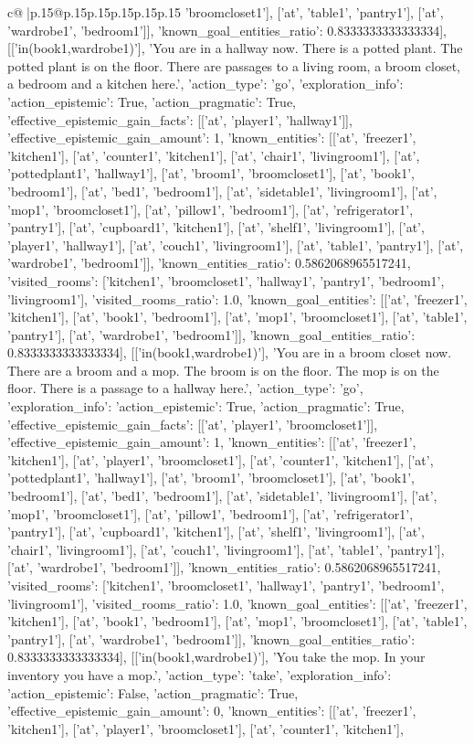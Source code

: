 \documentclass{article}
\begin{document}
{\begin{supertabular}{c@{$\;$}|p{.15\linewidth}@{}p{.15\linewidth}p{.15\linewidth}p{.15\linewidth}p{.15\linewidth}p{.15\linewidth}}
{{{'broomcloset1'], ['at', 'table1', 'pantry1'], ['at', 'wardrobe1', 'bedroom1']], 'known_goal_entities_ratio': 0.8333333333333334}}], [['in(book1,wardrobe1)'], 'You are in a hallway now. There is a potted plant. The potted plant is on the floor. There are passages to a living room, a broom closet, a bedroom and a kitchen here.', {'action_type': 'go', 'exploration_info': {'action_epistemic': True, 'action_pragmatic': True, 'effective_epistemic_gain_facts': [['at', 'player1', 'hallway1']], 'effective_epistemic_gain_amount': 1, 'known_entities': [['at', 'freezer1', 'kitchen1'], ['at', 'counter1', 'kitchen1'], ['at', 'chair1', 'livingroom1'], ['at', 'pottedplant1', 'hallway1'], ['at', 'broom1', 'broomcloset1'], ['at', 'book1', 'bedroom1'], ['at', 'bed1', 'bedroom1'], ['at', 'sidetable1', 'livingroom1'], ['at', 'mop1', 'broomcloset1'], ['at', 'pillow1', 'bedroom1'], ['at', 'refrigerator1', 'pantry1'], ['at', 'cupboard1', 'kitchen1'], ['at', 'shelf1', 'livingroom1'], ['at', 'player1', 'hallway1'], ['at', 'couch1', 'livingroom1'], ['at', 'table1', 'pantry1'], ['at', 'wardrobe1', 'bedroom1']], 'known_entities_ratio': 0.5862068965517241, 'visited_rooms': ['kitchen1', 'broomcloset1', 'hallway1', 'pantry1', 'bedroom1', 'livingroom1'], 'visited_rooms_ratio': 1.0, 'known_goal_entities': [['at', 'freezer1', 'kitchen1'], ['at', 'book1', 'bedroom1'], ['at', 'mop1', 'broomcloset1'], ['at', 'table1', 'pantry1'], ['at', 'wardrobe1', 'bedroom1']], 'known_goal_entities_ratio': 0.8333333333333334}}], [['in(book1,wardrobe1)'], 'You are in a broom closet now. There are a broom and a mop. The broom is on the floor. The mop is on the floor. There is a passage to a hallway here.', {'action_type': 'go', 'exploration_info': {'action_epistemic': True, 'action_pragmatic': True, 'effective_epistemic_gain_facts': [['at', 'player1', 'broomcloset1']], 'effective_epistemic_gain_amount': 1, 'known_entities': [['at', 'freezer1', 'kitchen1'], ['at', 'player1', 'broomcloset1'], ['at', 'counter1', 'kitchen1'], ['at', 'pottedplant1', 'hallway1'], ['at', 'broom1', 'broomcloset1'], ['at', 'book1', 'bedroom1'], ['at', 'bed1', 'bedroom1'], ['at', 'sidetable1', 'livingroom1'], ['at', 'mop1', 'broomcloset1'], ['at', 'pillow1', 'bedroom1'], ['at', 'refrigerator1', 'pantry1'], ['at', 'cupboard1', 'kitchen1'], ['at', 'shelf1', 'livingroom1'], ['at', 'chair1', 'livingroom1'], ['at', 'couch1', 'livingroom1'], ['at', 'table1', 'pantry1'], ['at', 'wardrobe1', 'bedroom1']], 'known_entities_ratio': 0.5862068965517241, 'visited_rooms': ['kitchen1', 'broomcloset1', 'hallway1', 'pantry1', 'bedroom1', 'livingroom1'], 'visited_rooms_ratio': 1.0, 'known_goal_entities': [['at', 'freezer1', 'kitchen1'], ['at', 'book1', 'bedroom1'], ['at', 'mop1', 'broomcloset1'], ['at', 'table1', 'pantry1'], ['at', 'wardrobe1', 'bedroom1']], 'known_goal_entities_ratio': 0.8333333333333334}}], [['in(book1,wardrobe1)'], 'You take the mop. In your inventory you have a mop.', {'action_type': 'take', 'exploration_info': {'action_epistemic': False, 'action_pragmatic': True, 'effective_epistemic_gain_amount': 0, 'known_entities': [['at', 'freezer1', 'kitchen1'], ['at', 'player1', 'broomcloset1'], ['at', 'counter1', 'kitchen1'], }}}
\end{supertabular}}
\end{document}
